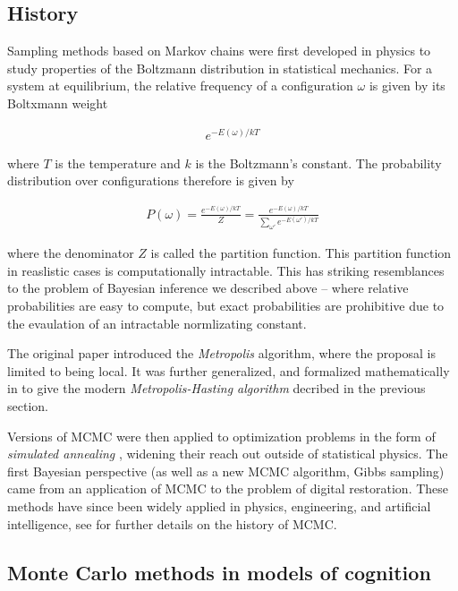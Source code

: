 \subsection{History}
Sampling methods based on Markov chains were first developed in physics to study properties of the Boltzmann distribution in statistical mechanics. \cite{metropolis1953equation} For a system at equilibrium, the relative frequency of a configuration $\omega$ is given by its Boltxmann weight

\begin{align}
e ^{-E(\omega) / kT}
\end{align}

where $T$ is the temperature and $k$ is the Boltzmann's constant. The probability distribution over configurations therefore is given by 

\begin{align}
P(\omega) = \frac{ e ^{-E(\omega) / kT}} {Z} = \frac{ e ^{-E(\omega) / kT}} {\sum_{\omega'} e ^{-E(\omega') / kT}}
\end{align}

where the denominator $Z$ is called the partition function. This partition function in reaslistic cases is computationally intractable. This has striking resemblances to the problem of Bayesian inference we described above -- where relative probabilities are easy to compute, but exact probabilities are prohibitive due to the evaulation of an intractable normlizating constant. 

The original paper \citet{metropolis1953equation} introduced the \textit{Metropolis} algorithm, where the proposal is limited to being local. It was further generalized, and formalized mathematically in \citet{hastings1970monte} to give the modern \textit{Metropolis-Hasting algorithm} decribed in the previous section.

Versions of MCMC were then applied to optimization problems in the form of \textit{simulated annealing} \cite{kirkpatrick1983optimization}, widening their reach out outside of statistical physics. The first Bayesian perspective (as well as a new MCMC algorithm, Gibbs sampling) came from an application of MCMC to the problem of digital restoration\cite{geman1984stochastic}. These methods have since been widely applied in physics, engineering, and artificial intelligence, see \citet{richey2010evolution} for further details on the history of MCMC.


\subsection{Monte Carlo methods in models of cognition}

